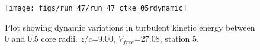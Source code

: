 \begin{figure}[H]
\centering
\texttt{[image: figs/run\_47/run\_47\_ctke\_05rdynamic]}
\caption{Plot showing dynamic variations in turbulent kinetic energy between 0 and 0.5 core radii. $z/c$=9.00, $V_{free}$=27.08, station 5.}
\label{fig:run_47_ctke_05rdynamic}
\end{figure}


